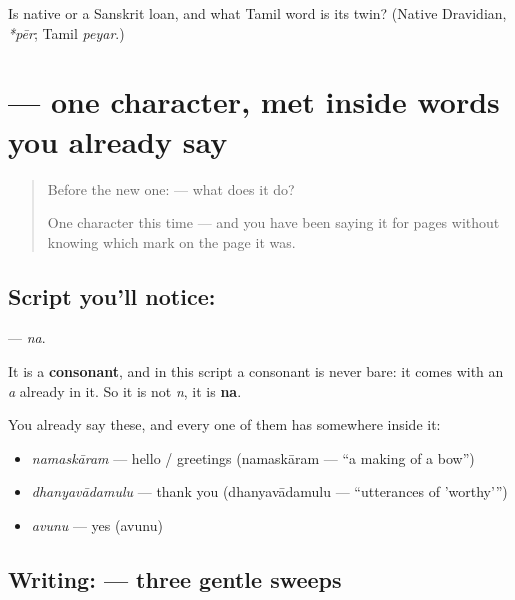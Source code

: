 \begin{tcolorbox}[breakable,colback=teal!4,colframe=teal!35!black,title={Before you move on}]
Is \textbf{} native or a Sanskrit loan, and what Tamil word is its twin? (Native Dravidian, \emph{*pēr}; Tamil \emph{peyar}.)
\end{tcolorbox}
\section[\texorpdfstring{\te{న} (na)}{న (na)}]{ — one character, met inside words you already say}

\label{lesson:TE-S109-letter-na}



\begin{quote}
Before the new one:  — what does it do?

One character this time — and you have been saying it for pages without knowing which mark on the page it was.
\end{quote}

\subsection*{Script you'll notice: }
\textbf{} — \emph{na}.

It is a \textbf{consonant}, and in this script a consonant is never bare: it comes with an \emph{a} already in it. So it is not \emph{n}, it is \textbf{na}.

You already say these, and every one of them has  somewhere inside it:

\begin{itemize}
\raggedright
  \item \textbf{} \emph{namaskāram} — hello / greetings (namaskāram — \textquotedblleft{}a making of a bow\textquotedblright{})
  \item \textbf{} \emph{dhanyavādamulu} — thank you (dhanyavādamulu — \textquotedblleft{}utterances of 'worthy'\textquotedblright{})
  \item \textbf{} \emph{avunu} — yes (avunu)
\end{itemize}

\subsection*{Writing:  — three gentle sweeps}

